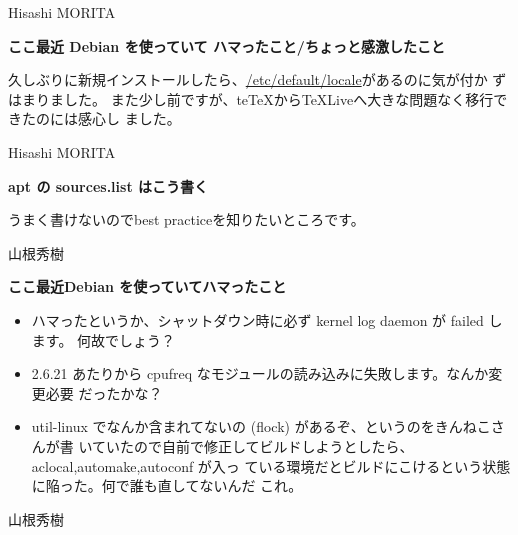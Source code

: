 \documentclass[cjk,dvipdfmx,12pt]{beamer}
\newenvironment{commandline}%
{\VerbatimEnvironment
  \begin{Sbox}\begin{minipage}{0.9\hsize}\begin{fontsize}{7.3}{7.3} \begin{BVerbatim}}%
{\end{BVerbatim}\end{fontsize}\end{minipage}\end{Sbox}
  \setlength{\fboxsep}{8pt}

\vspace{6pt}%
\fcolorbox{dancerdarkblue}{dancerlightblue}{\TheSbox}

\vspace{6pt}%
}
\begin{document}
\begin{frame}{Hisashi MORITA}

\textbf{ここ最近 Debian を使っていて ハマったこと/ちょっと感激したこと}

久しぶりに新規インストールしたら、\url{/etc/default/locale}があるのに気が付か
ずはまりました。
また少し前ですが、teTeXからTeXLiveへ大きな問題なく移行できたのには感心し
ました。

\end{frame}\begin{frame}{Hisashi MORITA}

\textbf{apt の sources.list はこう書く}

うまく書けないのでbest practiceを知りたいところです。

\end{frame}\begin{frame}{山根秀樹}

\textbf{ここ最近Debian を使っていてハマったこと}

\begin{itemize}
 \item ハマったというか、シャットダウン時に必ず kernel log daemon が failed します。
 何故でしょう？
 \item 2.6.21 あたりから cpufreq なモジュールの読み込みに失敗します。なんか変更必要
 だったかな？
 \item util-linux でなんか含まれてないの (flock) があるぞ、というのをきんねこさんが書
 いていたので自前で修正してビルドしようとしたら、aclocal,automake,autoconf が入っ
 ている環境だとビルドにこけるという状態に陥った。何で誰も直してないんだ
       これ。
\end{itemize}
\end{frame}\begin{frame}{山根秀樹}
\begin{itemize}


\end{itemize}
\end{frame}
\end{document}
